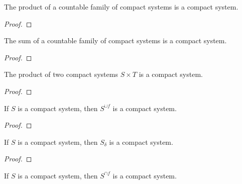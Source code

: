 \begin{lemma}\label{lem:IsCompactSystem.pi}
The product of a countable family of compact systems is a compact system.
\end{lemma}

\begin{proof}

\end{proof}


\begin{lemma}\label{lem:IsCompactSystem.sigma}
The sum of a countable family of compact systems is a compact system.
\end{lemma}

\begin{proof}

\end{proof}


\begin{lemma}\label{lem:IsCompactSystem.memProd}
  \leanok
The product of two compact systems $S \times T$ is a compact system.
\end{lemma}

\begin{proof}

\end{proof}


\begin{lemma}\label{lem:IsCompactSystem.supClosure}
  \leanok
If $S$ is a compact system, then $S^{\cup f}$ is a compact system.
\end{lemma}

\begin{proof}

\end{proof}


\begin{lemma}\label{lem:IsCompactSystem.countableInfClosure}
If $S$ is a compact system, then $S_\delta$ is a compact system.
\end{lemma}

\begin{proof}

\end{proof}


\begin{lemma}\label{lem:IsCompactSystem.infClosure}
  \leanok
If $S$ is a compact system, then $S^{\cap f}$ is a compact system.
\end{lemma}

